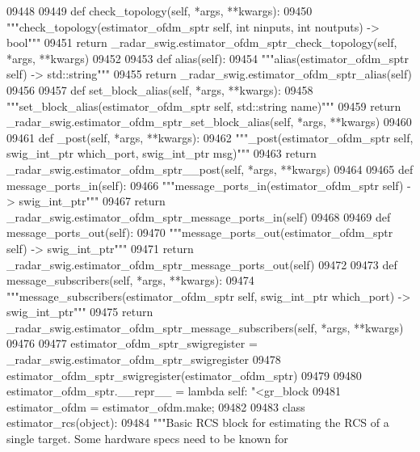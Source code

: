 \begin{DoxyCode}
{{{{{{{{{{{{{{{{{{{{{{{{{{{{{{09448 
09449     \textcolor{keyword}{def }check_topology(self, *args, **kwargs):
09450         \textcolor{stringliteral}{"""check\_topology(estimator\_ofdm\_sptr self, int ninputs, int noutputs) -> bool"""}
09451         \textcolor{keywordflow}{return} \_radar\_swig.estimator\_ofdm\_sptr\_check\_topology(self, *args, **kwargs)
09452 
09453     \textcolor{keyword}{def }alias(self):
09454         \textcolor{stringliteral}{"""alias(estimator\_ofdm\_sptr self) -> std::string"""}
09455         \textcolor{keywordflow}{return} \_radar\_swig.estimator\_ofdm\_sptr\_alias(self)
09456 
09457     \textcolor{keyword}{def }set_block_alias(self, *args, **kwargs):
09458         \textcolor{stringliteral}{"""set\_block\_alias(estimator\_ofdm\_sptr self, std::string name)"""}
09459         \textcolor{keywordflow}{return} \_radar\_swig.estimator\_ofdm\_sptr\_set\_block\_alias(self, *args, **kwargs)
09460 
09461     \textcolor{keyword}{def }_post(self, *args, **kwargs):
09462         \textcolor{stringliteral}{"""\_post(estimator\_ofdm\_sptr self, swig\_int\_ptr which\_port, swig\_int\_ptr msg)"""}
09463         \textcolor{keywordflow}{return} \_radar\_swig.estimator\_ofdm\_sptr\_\_post(self, *args, **kwargs)
09464 
09465     \textcolor{keyword}{def }message_ports_in(self):
09466         \textcolor{stringliteral}{"""message\_ports\_in(estimator\_ofdm\_sptr self) -> swig\_int\_ptr"""}
09467         \textcolor{keywordflow}{return} \_radar\_swig.estimator\_ofdm\_sptr\_message\_ports\_in(self)
09468 
09469     \textcolor{keyword}{def }message_ports_out(self):
09470         \textcolor{stringliteral}{"""message\_ports\_out(estimator\_ofdm\_sptr self) -> swig\_int\_ptr"""}
09471         \textcolor{keywordflow}{return} \_radar\_swig.estimator\_ofdm\_sptr\_message\_ports\_out(self)
09472 
09473     \textcolor{keyword}{def }message_subscribers(self, *args, **kwargs):
09474         \textcolor{stringliteral}{"""message\_subscribers(estimator\_ofdm\_sptr self, swig\_int\_ptr which\_port) -> swig\_int\_ptr"""}
09475         \textcolor{keywordflow}{return} \_radar\_swig.estimator\_ofdm\_sptr\_message\_subscribers(self, *args, **kwargs)
09476 
09477 estimator\_ofdm\_sptr\_swigregister = \_radar\_swig.estimator\_ofdm\_sptr\_swigregister
09478 estimator_ofdm_sptr_swigregister(estimator\_ofdm\_sptr)
09479 
09480 estimator\_ofdm\_sptr.\_\_repr\_\_ = \textcolor{keyword}{lambda} self: \textcolor{stringliteral}{"<gr\_block %
09481 estimator\_ofdm = estimator\_ofdm.make;
09482 
09483 \textcolor{keyword}{class }estimator_rcs(object):
09484     \textcolor{stringliteral}{"""Basic RCS block for estimating the RCS of a single target. Some hardware specs need to be known for
}}}}}}}}}}}}}}}}}}}}}}}}}}}}}}}}
\end{DoxyCode}
